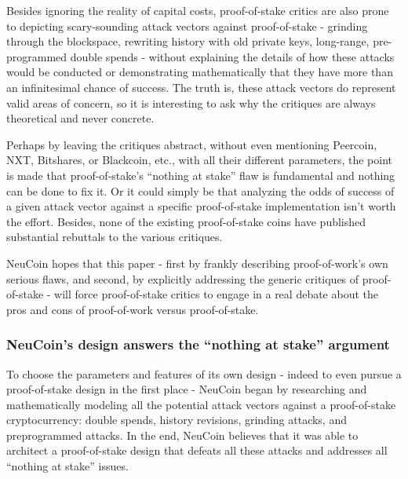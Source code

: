 \documentclass[a4paper,11pt]{article}
\begin{document}
Besides ignoring the reality of capital costs, proof-of-stake critics are also prone to depicting scary-sounding attack vectors against proof-of-stake - grinding through the blockspace, rewriting history with old private keys, long-range, pre-programmed double spends - without explaining the details of how these attacks would be conducted or demonstrating mathematically that they have more than an infinitesimal chance of success. The truth is, these attack vectors do represent valid areas of concern, so it is interesting to ask why the critiques are always theoretical and never concrete.

Perhaps by leaving the critiques abstract, without even mentioning Peercoin, NXT, Bitshares, or Blackcoin, etc., with all their different parameters, the point is made that proof-of-stake's ``nothing at stake'' flaw is fundamental and nothing can be done to fix it. Or it could simply be that analyzing the odds of success of a given attack vector against a specific proof-of-stake implementation isn't worth the effort. Besides, none of the existing proof-of-stake coins have published substantial rebuttals to the various critiques. 

NeuCoin hopes that this paper - first by frankly describing proof-of-work's own serious flaws, and second, by explicitly addressing the generic critiques of proof-of-stake - will force proof-of-stake critics to engage in a real debate about the pros and cons of proof-of-work versus proof-of-stake.

\subsubsection*{NeuCoin's design answers the ``nothing at stake'' argument}

To choose the parameters and features of its own design - indeed to even pursue a proof-of-stake design in the first place - NeuCoin began by researching and mathematically modeling all the potential attack vectors against a proof-of-stake cryptocurrency: double spends, history revisions, grinding attacks, and preprogrammed attacks. In the end, NeuCoin believes that it was able to architect a proof-of-stake design that defeats all these attacks and addresses all ``nothing at stake'' issues.
\end{document}
